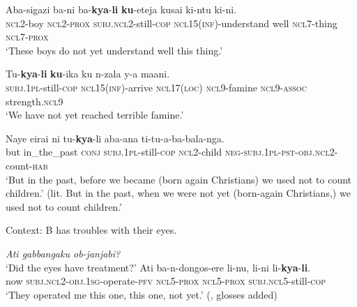 \begin{exe}
	\ex\label{exAppendixRuuliNotYet1}
	\gll Aba-sigazi ba-ni ba-\textbf{kya}-\textbf{li} \textbf{ku}-eteja kusai ki-ntu ki-ni.\\
	\textsc{ncl2}-boy \textsc{ncl}2-\textsc{prox} \textsc{subj}.\textsc{ncl}2-still-\textsc{cop} \textsc{ncl}15(\textsc{inf})-understand well \textsc{ncl}7-thing \textsc{ncl}7-\textsc{prox}\\
	\glt \lq These boys do not yet understand well this thing.\rq{ }\parencite[76]{MolochievaEtAl2021}
	
	\ex\label{exAppendixRuuliNotYet2}
	\gll Tu-\textbf{kya}-\textbf{li} \textbf{ku}-ika ku n-zala y-a maani.\\
	\textsc{subj}.1\textsc{pl}-still-\textsc{cop} \textsc{ncl}15(\textsc{inf})-arrive \textsc{ncl}17(\textsc{loc}) \textsc{ncl}9-famine \textsc{ncl}9-\textsc{assoc} strength.\textsc{ncl9}\\
	\glt \lq We have not yet reached terrible famine.' \parencite[81]{MolochievaEtAl2021}
	
	\ex\label{exAppendixRuuliNotYet3}
	\gll Naye eirai ni tu-\textbf{kya}-li aba-ana ti-tu-a-ba-bala-nga.\\
		but in\_the\_past \textsc{conj} \textsc{subj}.1\textsc{pl}-still-\textsc{cop} \textsc{ncl}2-child \textsc{neg}-\textsc{subj}.1\textsc{pl}-\textsc{pst}-\textsc{obj}.\textsc{ncl}2-count-\textsc{hab}\\
	\glt \lq But in the past, before we became (born again Christians) we used not to count children.’ (lit. But in the past, when we were not yet (born-again Christians,) we used not to count children.\rq{ }\parencite[76]{MolochievaEtAl2021}

	\ex\label{exAppendixRuuliNotYet4}
	Context: B has troubles with their eyes.\\
	\begin{xlist}
		  \textit{Ati gabbangaku ob-janjabi?}\\
		 \lq Did the eyes have treatment?'
		\gll Ati ba-n-dongos-ere li-nu, li-ni li-\textbf{kya}-\textbf{li}.\\
		now \textsc{subj}.\textsc{ncl}2-\textsc{obj}.1\textsc{sg}-operate-\textsc{pfv} \textsc{ncl}5-\textsc{prox} \textsc{ncl}5-\textsc{prox} \textsc{subj}.\textsc{ncl}5-still-\textsc{cop}\\
		\glt \lq They operated me this one, this one, not yet.\rq{ }(\cite{RuuliCorpus}, glosses added)
	\end{xlist}
\end{exe}

